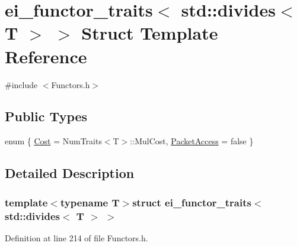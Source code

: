 \hypertarget{structei__functor__traits_3_01std_1_1divides_3_01_t_01_4_01_4}{\section{ei\-\_\-functor\-\_\-traits$<$ std\-:\-:divides$<$ T $>$ $>$ Struct Template Reference}
\label{structei__functor__traits_3_01std_1_1divides_3_01_t_01_4_01_4}
}


{\ttfamily \#include $<$Functors.\-h$>$}

\subsection*{Public Types}
\begin{DoxyCompactItemize}
\item 
enum \{ \hyperlink{structei__functor__traits_3_01std_1_1divides_3_01_t_01_4_01_4_a933eb53d4a5e8be31d43f4375d51f04fa81059c44a88db479af3914500c2210d7}{Cost} = Num\-Traits$<$T$>$\-:\-:Mul\-Cost, 
\hyperlink{structei__functor__traits_3_01std_1_1divides_3_01_t_01_4_01_4_a933eb53d4a5e8be31d43f4375d51f04fad5042d737e0d246c6a163534135917fc}{Packet\-Access} = false
 \}
\end{DoxyCompactItemize}


\subsection{Detailed Description}
\subsubsection*{template$<$typename T$>$struct ei\-\_\-functor\-\_\-traits$<$ std\-::divides$<$ T $>$ $>$}



Definition at line 214 of file Functors.\-h.



